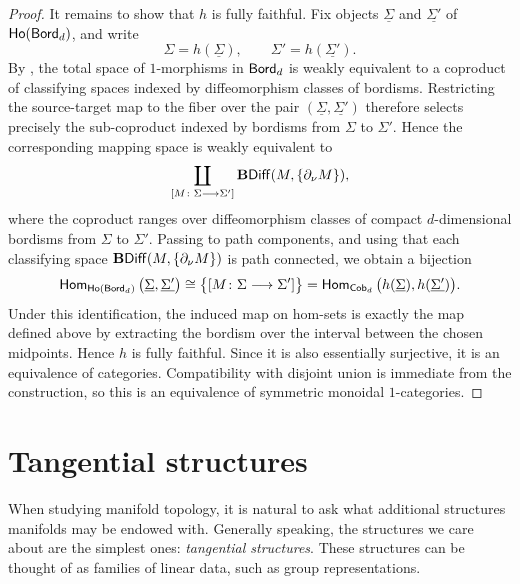 \begin{proof}
    It remains to show that $h$ is fully faithful. Fix objects $\underline{\Sigma}$ and $\underline{\Sigma'}$ of $\operatorname{\sf Ho}(\operatorname{\mathsf{Bord}}_d)$, and write
    \[
        \Sigma = h(\underline{\Sigma}), \qquad \Sigma' = h(\underline{\Sigma'}).
    \]
    By , the total space of $1$-morphisms in $\operatorname{\mathsf{Bord}}_d$ is weakly equivalent to a coproduct of classifying spaces indexed by diffeomorphism classes of bordisms. Restricting the source-target map to the fiber over the pair $(\underline{\Sigma},\underline{\Sigma'})$ therefore selects precisely the sub-coproduct indexed by bordisms from $\Sigma$ to $\Sigma'$. Hence the corresponding mapping space is weakly equivalent to
    \begin{equation}
        \coprod_{[M \colon \Sigma \longrightarrow \Sigma']} \mathbf{B}\!\operatorname{{\sf Diff}}(M,\{\partial_{\nu}M\}),
    \end{equation}
    where the coproduct ranges over diffeomorphism classes of compact $d$-dimensional bordisms from $\Sigma$ to $\Sigma'$. Passing to path components, and using that each classifying space $\mathbf{B}\!\operatorname{{\sf Diff}}(M,\{\partial_{\nu}M\})$ is path connected, we obtain a bijection
    \begin{equation}
        \operatorname{\sf Hom}_{\operatorname{\sf Ho}(\operatorname{\mathsf{Bord}}_d)}\big(\underline{\Sigma},\underline{\Sigma'}\big)
        \cong
        \big\{[M \colon \Sigma \longrightarrow \Sigma']\big\}
        =
        \operatorname{\sf Hom}_{\mathsf{Cob}_d}\big(h(\underline{\Sigma}),h(\underline{\Sigma'})\big).
    \end{equation}
    Under this identification, the induced map on hom-sets is exactly the map defined above by extracting the bordism over the interval between the chosen midpoints. Hence $h$ is fully faithful. Since it is also essentially surjective, it is an equivalence of categories. Compatibility with disjoint union is immediate from the construction, so this is an equivalence of symmetric monoidal $1$-categories.
\end{proof}

\section{Tangential structures}
\label{ch3:: sec: tangential structures}

When studying manifold topology, it is natural to ask what additional structures manifolds may be endowed with. Generally speaking, the structures we care about are the simplest ones: \emph{tangential structures}. These structures can be thought of as families of linear data, such as group representations.

